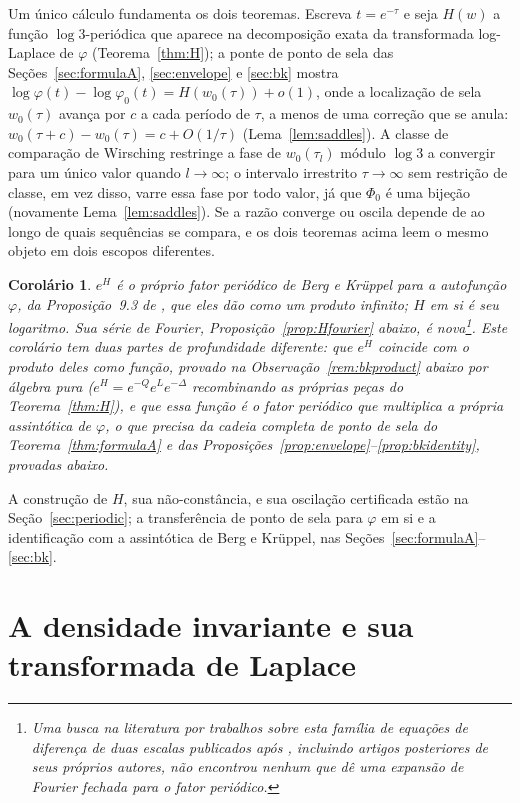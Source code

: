 \documentclass[11pt]{amsart}
\theoremstyle{plain}
\newtheorem{corollary}[theorem]{Corolário}
\theoremstyle{definition}
\theoremstyle{remark}
\begin{document}
Um único cálculo fundamenta os dois teoremas. Escreva $t = e^{-\tau}$ e seja $H(w)$ a função
$\log 3$-periódica que aparece na decomposição exata da transformada log-Laplace de $\varphi$
(Teorema~\ref{thm:H}); a ponte de ponto de sela das Seções~\ref{sec:formulaA}, \ref{sec:envelope} e
\ref{sec:bk} mostra $\log\varphi(t)-\log\varphi_0(t) = H(w_0(\tau))+o(1)$, onde a localização de
sela $w_0(\tau)$ avança por $c$ a cada período de $\tau$, a menos de uma correção que se anula:
$w_0(\tau+c)-w_0(\tau) = c+O(1/\tau)$ (Lema~\ref{lem:saddles}). A classe de comparação de Wirsching
restringe a fase de $w_0(\tau_l)$ módulo $\log 3$ a convergir para um único valor quando
$l\to\infty$; o intervalo irrestrito $\tau\to\infty$ sem restrição de classe, em vez disso, varre
essa fase por todo valor, já que $\Phi_0$ é uma bijeção (novamente Lema~\ref{lem:saddles}). Se a
razão converge ou oscila depende de ao longo de quais sequências se compara, e os dois teoremas
acima leem o mesmo objeto em dois escopos diferentes.

\begin{corollary}
\label{cor:bk}
$e^H$ é o próprio fator periódico de Berg e Kr\"uppel para a autofunção $\varphi$, da
Proposição~9.3 de \cite{bergkruppel1998}, que eles dão como um produto infinito; $H$ em si é seu
logaritmo. Sua série de Fourier, Proposição~\ref{prop:Hfourier} abaixo, é nova\footnote{Uma busca na
literatura por trabalhos sobre esta família de equações de diferença de duas escalas publicados
após \cite{bergkruppel1998}, incluindo artigos posteriores de seus próprios autores, não encontrou
nenhum que dê uma expansão de Fourier fechada para o fator periódico.}. Este corolário tem duas
partes de profundidade diferente: que $e^H$ coincide com o produto deles \emph{como função},
provado na Observação~\ref{rem:bkproduct} abaixo por álgebra pura ($e^H=e^{-Q}e^Le^{-\Delta}$
recombinando as próprias peças do Teorema~\ref{thm:H}), e que essa função é o fator periódico que
multiplica a própria assintótica de $\varphi$, o que precisa da cadeia completa de ponto de sela do
Teorema~\ref{thm:formulaA} e das Proposições~\ref{prop:envelope}--\ref{prop:bkidentity}, provadas
abaixo.
\end{corollary}

A construção de $H$, sua não-constância, e sua oscilação certificada estão na
Seção~\ref{sec:periodic}; a transferência de ponto de sela para $\varphi$ em si e a identificação
com a assintótica de Berg e Kr\"uppel, nas Seções~\ref{sec:formulaA}--\ref{sec:bk}.

\section{A densidade invariante e sua transformada de Laplace}
\label{sec:prelim}
\end{document}
